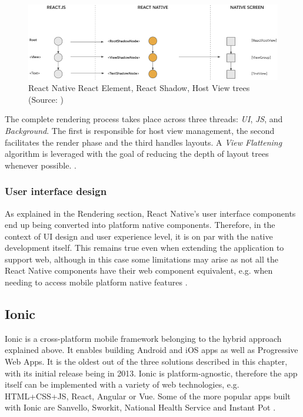 \begin{figure}[h]
    \centering
    \includegraphics[width=\textwidth]{img/rn_trees}
    \caption{React Native React Element, React Shadow, Host View trees (Source: \cite{react_native_docs_render})}
    \label{fig:rn_trees}
\end{figure}

The complete rendering process takes place across three threads: \emph{UI}, \emph{JS}, and \emph{Background}. The first is responsible for host view management, the second facilitates the render phase and the third handles layouts. A \emph{View Flattening} algorithm is leveraged with the goal of reducing the depth of layout trees whenever possible.  \cite{react_native_docs_render,react_native_docs_view_flattening,react_native_docs_threading}. 

\subsubsection*{User interface design}

As explained in the Rendering section, React Native's user interface components end up being converted into platform native components. Therefore, in the context of UI design and user experience level, it is on par with the native development itself. This remains true even when extending the application to support web, although in this case some limitations may arise as not all the React Native components have their web component equivalent, e.g. when needing to access mobile platform native features \cite{harsh_complete_guide_to_rn_web}.

\subsection{Ionic}

Ionic is a cross-platform mobile framework belonging to the hybrid approach explained above. It enables building Android and iOS apps as well as Progressive Web Apps. It is the oldest out of the three solutions described in this chapter, with its initial release being in 2013. Ionic is platform-agnostic, therefore the app itself can be implemented with a variety of web technologies, e.g. HTML+CSS+JS, React, Angular or Vue. Some of the more popular apps built with Ionic are Sanvello, Sworkit, National Health Service and Instant Pot \cite{ionic_customers,ionic_docs_overview}.

